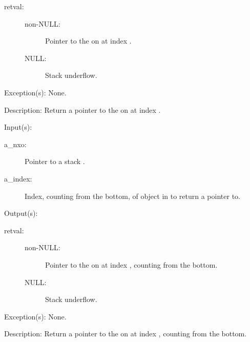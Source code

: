 \begin{capi}
\begin{capilist}
\begin{description}
		\item[retval: ]
			\begin{description}\item[]
			\item[non-NULL: ]
				Pointer to the  on  at
				index .
			\item[NULL: ]
				Stack underflow.
			\end{description}
		\end{description}
	\item[Exception(s): ] None.
	\item[Description: ]
		Return a pointer to the  on  at index
		.
	\end{capilist}
\label{nxo_stack_nbget}
	\begin{capilist}
	\item[Input(s): ]
		\begin{description}\item[]
		\item[a\_nxo: ]
			Pointer to a stack .
		\item[a\_index: ]
			Index, counting from the bottom, of object in
			 to return a pointer to.
		\end{description}
	\item[Output(s): ]
		\begin{description}\item[]
		\item[retval: ]
			\begin{description}\item[]
			\item[non-NULL: ]
				Pointer to the  on  at
				index , counting from the bottom.
			\item[NULL: ]
				Stack underflow.
			\end{description}
		\end{description}
	\item[Exception(s): ] None.
	\item[Description: ]
		Return a pointer to the  on  at index
		, counting from the bottom.
	\end{capilist}
\label{nxo_stack_down_get}
\end{capi}
